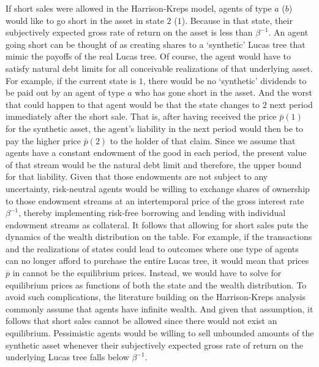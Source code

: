If short sales were allowed in the Harrison-Kreps model,
agents of type $a$ ($b$) would like to go short in the 
asset in state $2$ ($1$). Because in that state, their
subjectively expected gross rate 
of return on the asset is less than $\beta^{-1}$. An
agent going short can be thought of as creating shares to
a `synthetic' Lucas tree that mimic the payoffs of 
the real Lucas tree. Of course, the agent would have
to satisfy  natural debt limits for all conceivable
realizations of that underlying asset. 
For example, if the current state is $1$, there
would be no `synthetic' dividends to be paid out by an 
agent of type $a$ who has gone short in the asset. 
And the worst that could happen to that agent would 
be that the state  changes to $2$  next period immediately
after the short sale. That is, after having
received the price $\bar p(1)$ for the synthetic
asset, the agent's liability in the next period
would then be to pay the higher price $\bar p(2)$ 
to the holder of that claim. Since we assume that
agents have a constant endowment of
the good in each period, the present value of that
stream would be the natural debt limit and therefore, 
the upper bound for that liability. Given that those 
endowments are not subject to any uncertainty, 
risk-neutral agents would be willing to exchange 
shares of ownership to those endowment streams at 
an intertemporal price of the gross interest rate 
$\beta^{-1}$, thereby implementing risk-free
borrowing and lending with individual endowment 
streams as collateral. It follows that allowing for 
short sales puts the dynamics of the wealth 
distribution on the table. For example, if the 
transactions and the realizations of states could lead 
to outcomes where one type of agents can no longer 
afford to purchase the entire Lucas tree, it would 
mean that prices $\overline p$ in  cannot
be the equilibrium prices. Instead, we would have to 
solve for equilibrium prices as functions of both the 
state and the wealth distribution. To avoid 
such complications, the literature building on the
Harrison-Kreps analysis commonly assume that agents
have infinite wealth. And given that assumption, it
follows that short sales cannot be allowed since there 
would not exist an equilibrium. Pessimistic agents 
would be willing to sell unbounded amounts of the 
synthetic asset whenever their subjectively expected 
gross rate of return on the underlying Lucas 
tree falls below $\beta^{-1}$.
%
%

